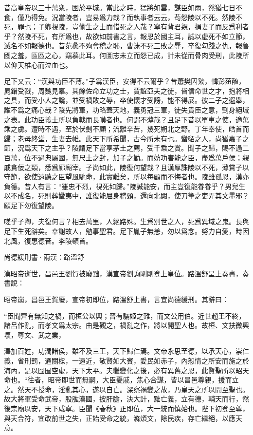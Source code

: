 \documentclass[12pt,a4paper]{ctexbook}
\begin{document}
昔高皇帝以三十萬衆，困於平城。當此之時，猛將如雲，謀臣如雨，然猶七日不食，僅乃得免。況當陵者，豈易爲力哉？而執事者云云，苟怨陵以不死。然陵不死，罪也；子卿視陵，豈偷生之士而惜死之人哉？寧有背君親，捐妻子而反爲利者乎？然陵不死，有所爲也，故欲如前書之言，報恩於國主耳，誠以虛死不如立節，滅名不如報德也。昔范蠡不殉會稽之恥，曹沬不死三敗之辱，卒復勾踐之仇，報魯國之羞，區區之心，竊慕此耳。何圖志未立而怨已成，計未從而骨肉受刑，此陵所以仰天椎心而泣血也。\par
足下又云：“漢與功臣不薄。”子爲漢臣，安得不云爾乎？昔蕭樊囚縶，韓彭葅醢，晁錯受戮，周魏見辜。其餘佐命立功之士，賈誼亞夫之徒，皆信命世之才，抱將相之具，而受小人之讒，並受禍敗之辱，卒使懷才受謗，能不得展。彼二子之遐舉，誰不爲之痛心哉？陵先將軍，功略蓋天地，義勇冠三軍，徒失貴臣之意，剄身絕域之表。此功臣義士所以負戟而長嘆者也。何謂不薄哉？且足下昔以單車之使，適萬乘之虜。遭時不遇，至於伏劍不顧；流離辛苦，幾死朔北之野。丁年奉使，皓首而歸；老母終堂，生妻去帷。此天下所希聞，古今所未有也。蠻貊之人，尚猶嘉子之節，況爲天下之主乎？陵謂足下當享茅土之薦，受千乘之賞。聞子之歸，賜不過二百萬，位不過典屬國，無尺土之封，加子之勤。而妨功害能之臣，盡爲萬戶侯；親戚貪佞之類，悉爲廊廟宰。子尚如此，陵復何望哉？且漢厚誅陵以不死，薄賞子以守節，欲使遠聽之臣望風馳命，此實難矣，所以每顧而不悔者也。陵雖孤恩，漢亦負德。昔人有言：“雖忠不烈，視死如歸。”陵誠能安，而主豈復能眷眷乎？男兒生以不成名，死則葬蠻夷中，誰復能屈身稽顙，還向北闕，使刀筆之吏弄其文墨邪？願足下勿復望陵。\par
嗟乎子卿，夫復何言？相去萬里，人絕路殊。生爲別世之人，死爲異域之鬼。長與足下生死辭矣。幸謝故人，勉事聖君。足下胤子無恙，勿以爲念。努力自愛，時因北風，復惠德音。李陵頓首。\par
尚德緩刑書·兩漢：路溫舒 \par
漢昭帝逝世，昌邑王劉賀被廢黜，漢宣帝劉詢剛剛登上皇位。路溫舒呈上奏書，奏書說：\par
昭帝崩，昌邑王賀廢，宣帝初即位，路溫舒上書，言宜尚德緩刑。其辭曰：\par
“臣聞齊有無知之禍，而桓公以興；晉有驪姬之難，而文公用伯。近世趙王不終，諸呂作亂，而孝文爲太宗。由是觀之，禍亂之作，將以開聖人也。故桓、文扶微興壞，尊文、武之業，\par
澤加百姓，功潤諸侯，雖不及三王，天下歸仁焉。文帝永思至德，以承天心，崇仁義，省刑罰，通關樑，一遠近，敬賢如大賓，愛民如赤子，內恕情之所安而施之於海內，是以囹圄空虛，天下太平。夫繼變化之後，必有異舊之恩，此賢聖所以昭天命也。“往者，昭帝即世而無嗣，大臣憂戚，焦心合謀，皆以昌邑尊親，援而立之。然天不授命，淫亂其心，遂以自亡。深察禍變之故，乃皇天之所以開至聖也。故大將軍受命武帝，股肱漢國，披肝膽，決大計，黜亡義，立有德，輔天而行，然後宗廟以安，天下咸寧。臣聞《春秋》正即位，大一統而慎始也。陛下初登至尊，與天合符，宜改前世之失，正始受命之統，滌煩文，除民疾，存亡繼絕，以應天意。\par
\end{document}
